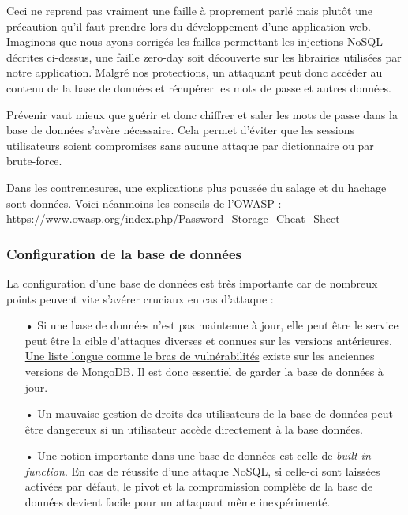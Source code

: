 \documentclass[12pt]{article}
\begin{document}
Ceci ne reprend pas vraiment une faille à proprement parlé mais plutôt une précaution qu'il faut prendre lors du développement d'une application web. Imaginons que nous ayons corrigés les failles permettant les injections NoSQL décrites ci-dessus, une faille zero-day soit découverte sur
les librairies utilisées par notre application. Malgré nos protections, un attaquant peut donc accéder au contenu de la base de données et récupérer les mots de passe et autres données.

Prévenir vaut mieux que guérir et donc chiffrer et saler les mots de passe dans la base de données s'avère nécessaire. Cela permet d'éviter que les sessions utilisateurs soient compromises sans aucune attaque par dictionnaire ou par brute-force. 

Dans les contremesures, une explications plus poussée du salage et du hachage sont données. Voici néanmoins les conseils de l'OWASP : \url{https://www.owasp.org/index.php/Password_Storage_Cheat_Sheet}

\subsubsection{Configuration de la base de données}

La configuration d'une base de données est très importante car de nombreux points peuvent vite s'avérer cruciaux en cas d'attaque : 

\begin{itemize}
\item[•] Si une base de données n'est pas maintenue à jour, elle peut être le service peut être la cible d'attaques diverses et connues sur les versions antérieures. \href{https://www.cvedetails.com/vulnerability-list/vendor_id-12752/product_id-25450/Mongodb-Mongodb.html}{Une liste longue comme le bras de vulnérabilités} existe sur les anciennes versions de MongoDB. Il est donc essentiel de garder la base de données à jour.
\item[•] Un mauvaise gestion de droits des utilisateurs de la base de données peut être dangereux si un utilisateur accède directement à la base données.
\item[•] Une notion importante dans une base de données est celle de \emph{built-in function}. En cas de réussite d'une attaque NoSQL, si celle-ci sont laissées activées par défaut, le pivot et la compromission complète de la base de données devient facile pour un attaquant même inexpérimenté.
\end{itemize}
\end{document}
